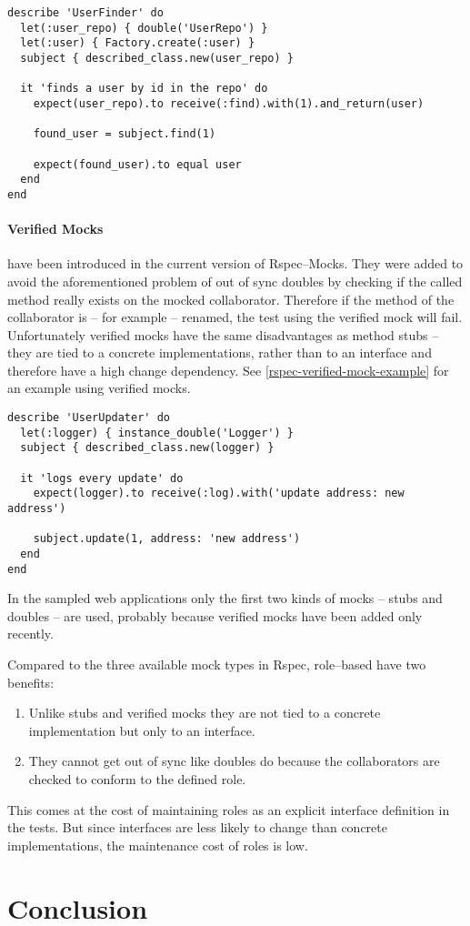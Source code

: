 \begin{lstlisting}[caption=An example Rspec test using a double,label=rspec-double-example]
describe 'UserFinder' do
  let(:user_repo) { double('UserRepo') }
  let(:user) { Factory.create(:user) }
  subject { described_class.new(user_repo) }
  
  it 'finds a user by id in the repo' do
    expect(user_repo).to receive(:find).with(1).and_return(user)
    
    found_user = subject.find(1)
    
    expect(found_user).to equal user
  end
end
\end{lstlisting}

\paragraph{Verified Mocks} have been introduced in the current version of Rspec–Mocks. They were added to avoid the aforementioned problem of out of sync doubles by checking if the called method really exists on the mocked collaborator. Therefore if the method of the collaborator is – for example – renamed, the test using the verified mock will fail. Unfortunately verified mocks have the same disadvantages as method stubs – they are tied to a concrete implementations, rather than to an interface and therefore have a high change dependency. See \autoref{rspec-verified-mock-example} for an example using verified mocks.

\begin{lstlisting}[caption=An example Rspec test using a verified mock,label=rspec-verified-mock-example]
describe 'UserUpdater' do
  let(:logger) { instance_double('Logger') }
  subject { described_class.new(logger) }
  
  it 'logs every update' do
    expect(logger).to receive(:log).with('update address: new address')
    
    subject.update(1, address: 'new address')
  end
end
\end{lstlisting}

In the sampled web applications only the first two kinds of mocks – stubs and doubles – are used, probably because verified mocks have been added only recently.

Compared to the three available mock types in Rspec, role–based have two benefits:

\begin{enumerate}
\item Unlike stubs and verified mocks they are not tied to a concrete implementation but only to an interface.
\item They cannot get out of sync like doubles do because the collaborators are checked to conform to the defined role.
\end{enumerate}

This comes at the cost of maintaining roles as an explicit interface definition in the tests. But since interfaces are less likely to change than concrete implementations, the maintenance cost of roles is low.

\section{Conclusion}
